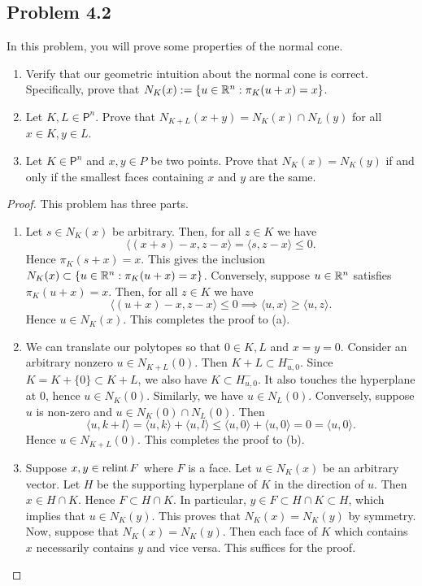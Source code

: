 \documentclass[12pt]{article}
\begin{document}
\newpage 

\subsection{Problem 4.2}

\begin{problem} \label{problem-4.2}
	In this problem, you will prove some properties of the normal cone. 
    \begin{enumerate}[label = (\alph*)]
        \item Verify that our geometric intuition about the normal cone is correct. Specifically, prove that $N_K(x) := \{u \in \mathbb{R}^n : \pi_K(u + x) = x\}$. 
        \item Let $K, L \in \mathsf{P}^n$. Prove that $N_{K+L}(x+y) = N_K(x) \cap N_L(y)$ for all $x \in K, y \in L$.
        \item Let $K \in \mathsf{P}^n$ and $x, y \in P$ be two points. Prove that $N_K(x) = N_K(y)$ if and only if the smallest faces containing $x$ and $y$ are the same. 
    \end{enumerate}
\end{problem}

\begin{proof}
	This problem has three parts. 
	\begin{enumerate}[label = (\alph*)]
		\item Let $s \in N_K(x)$ be arbitrary. Then, for all $z \in K$ we have 
		\[
			\langle (x+s) - x , z - x \rangle = \langle s, z - x \rangle \leq 0.
		\]
		Hence $\pi_K(s + x) = x$. This gives the inclusion $N_K(x) \subset \{u \in \mathbb{R}^n : \pi_K(u + x) = x\}$. Conversely, suppose $u \in \mathbb{R}^n$ satisfies $\pi_K(u+x) = x$. Then, for all $z \in K$ we have 
		\[
			\langle (u+x) - x, z - x \rangle \leq 0 \implies \langle u, x \rangle \geq \langle u, z \rangle.
		\]
		Hence $u \in N_K(x)$. This completes the proof to (a). 

		\item We can translate our polytopes so that $0 \in K, L$ and $x = y = 0$. Consider an arbitrary nonzero $u \in N_{K+L}(0)$. Then $K+L \subset H^{-}_{u, 0}$. Since $K = K + \{0\} \subset K + L$, we also have $K \subset H^-_{u, 0}$. It also touches the hyperplane at $0$, hence $u \in N_K(0)$. Similarly, we have $u \in N_L(0)$. Conversely, suppose $u$ is non-zero and $u \in N_K(0) \cap N_L(0)$. Then 
		\[
			\langle u, k+l \rangle = \langle u, k \rangle + \langle u, l \rangle \leq \langle u, 0 \rangle + \langle u, 0 \rangle = 0 = \langle u, 0 \rangle. 
		\]
		Hence $u \in N_{K+L}(0)$. This completes the proof to (b).

		\item Suppose $x, y \in \operatorname{relint} F$ where $F$ is a face. Let $u \in N_K(x)$ be an arbitrary vector. Let $H$ be the supporting hyperplane of $K$ in the direction of $u$. Then $x \in H \cap K$. Hence $F \subset H \cap K$. In particular, $y \in F \subset H \cap K \subset H$, which implies that $u \in N_K(y)$. This proves that $N_K(x) = N_K(y)$ by symmetry. Now, suppose that $N_K(x) = N_K(y)$. Then each face of $K$ which contains $x$ necessarily contains $y$ and vice versa. This suffices for the proof. 
	\end{enumerate}
\end{proof}
\end{document}
